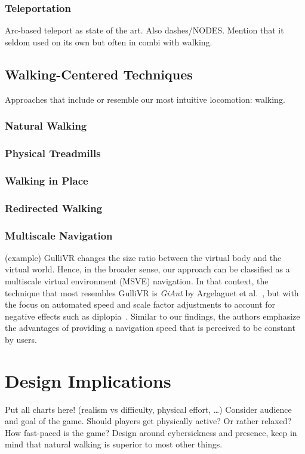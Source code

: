 \subsubsection{Teleportation}
Arc-based teleport as state of the art. Also dashes/NODES. Mention that it seldom used on its own but often in combi with walking.




\subsection{Walking-Centered Techniques}
Approaches that include or resemble our most intuitive locomotion: walking.


\subsubsection{Natural Walking}
\subsubsection{Physical Treadmills}
\subsubsection{Walking in Place}
\subsubsection{Redirected Walking}


\subsubsection{Multiscale Navigation}

(example)
GulliVR changes the size ratio between the virtual body and the virtual world. Hence, in the broader sense, our approach can be classified as a multiscale virtual environment (MSVE) navigation. In that context, the technique that most resembles GulliVR is \textit{GiAnt} by Argelaguet et al.~\cite{argelaguet2016giant}, but with the focus on automated speed and scale factor adjustments to account for negative effects such as diplopia~\cite{lambooij2009visual}. Similar to our findings, the authors emphasize the advantages of providing a navigation speed that is perceived to be constant by users.



\section{Design Implications}

Put all charts here! (realism vs difficulty, physical effort, …) Consider audience and goal of the game. Should players get physically active? Or rather relaxed? How fast-paced is the game? Design around cybersickness and presence, keep in mind that natural walking is superior to most other things.
